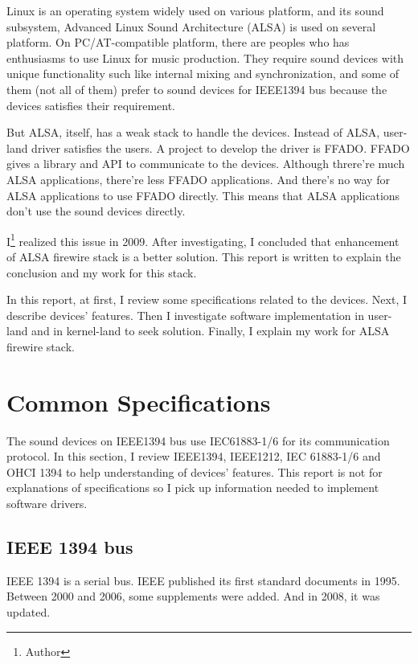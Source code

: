 \documentclass[onecolumn]{article}
\begin{document}
Linux is an operating system widely used on various platform, and its sound subsystem, Advanced Linux Sound Architecture (ALSA) is used on several platform. On PC/AT-compatible platform, there are peoples who has enthusiasms to use Linux for music production. They require sound devices with unique functionality such like internal mixing and synchronization, and some of them (not all of them) prefer to sound devices for IEEE1394 bus because the devices satisfies their requirement.

But ALSA, itself, has a weak stack to handle the devices. Instead of ALSA, user-land driver satisfies the users. A project to develop the driver is FFADO. FFADO gives a library and API to communicate to the devices. Although threre're much ALSA applications, there're less FFADO applications. And there's no way for ALSA applications to use FFADO directly. This means that ALSA applications don't use the sound devices directly.

I\footnote{Author} realized this issue in 2009. After investigating, I concluded that enhancement of ALSA firewire stack is a better solution. This report is written to explain the conclusion and my work for this stack.

In this report, at first, I review some specifications related to the devices. Next, I describe devices' features. Then I investigate software implementation in user-land and in kernel-land to seek solution. Finally, I explain my work for ALSA firewire stack.


\section{Common Specifications}

The sound devices on IEEE1394 bus use IEC61883-1/6 for its communication protocol. In this section, I review IEEE1394, IEEE1212, IEC 61883-1/6 and OHCI 1394 to help understanding of devices' features. This report is not for explanations of specifications so I pick up information needed to implement software drivers.

\subsection{IEEE 1394 bus}

IEEE 1394 is a serial bus. IEEE published its first standard documents in 1995\cite{ieee1394-1}. Between 2000 and 2006, some supplements were added\cite{ieee1394-1-a, ieee1394-1-b, ieee1394-1-c}. And in 2008, it was updated\cite{ieee1394-2}.
\end{document}
